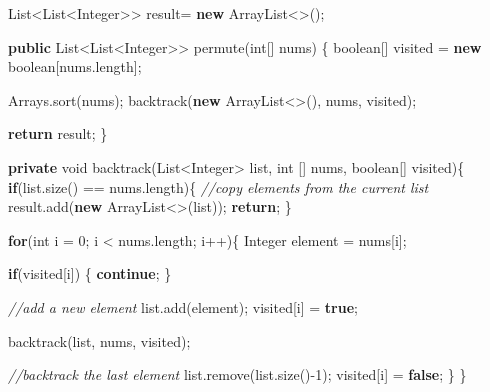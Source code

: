 \documentclass[]{book}
\newenvironment{Shaded}{\begin{snugshade}}{\end{snugshade}}
\newcommand{\BuiltInTok}[1]{#1}
\newcommand{\CommentTok}[1]{\textcolor[rgb]{0.56,0.35,0.01}{\textit{#1}}}
\newcommand{\DataTypeTok}[1]{\textcolor[rgb]{0.13,0.29,0.53}{#1}}
\newcommand{\DecValTok}[1]{\textcolor[rgb]{0.00,0.00,0.81}{#1}}
\newcommand{\FunctionTok}[1]{\textcolor[rgb]{0.00,0.00,0.00}{#1}}
\newcommand{\KeywordTok}[1]{\textcolor[rgb]{0.13,0.29,0.53}{\textbf{#1}}}
\newcommand{\NormalTok}[1]{#1}
\begin{document}
\begin{Shaded}
\begin{Highlighting}[]
\BuiltInTok{List}\NormalTok{<}\BuiltInTok{List}\NormalTok{<}\BuiltInTok{Integer}\NormalTok{>> result= }\KeywordTok{new} \BuiltInTok{ArrayList}\NormalTok{<>();}

\KeywordTok{public} \BuiltInTok{List}\NormalTok{<}\BuiltInTok{List}\NormalTok{<}\BuiltInTok{Integer}\NormalTok{>> }\FunctionTok{permute}\NormalTok{(}\DataTypeTok{int}\NormalTok{[] nums) \{}
    \DataTypeTok{boolean}\NormalTok{[] visited = }\KeywordTok{new} \DataTypeTok{boolean}\NormalTok{[nums.}\FunctionTok{length}\NormalTok{];}

    \BuiltInTok{Arrays}\NormalTok{.}\FunctionTok{sort}\NormalTok{(nums);}
    \FunctionTok{backtrack}\NormalTok{(}\KeywordTok{new} \BuiltInTok{ArrayList}\NormalTok{<>(), nums, visited);}

    \KeywordTok{return}\NormalTok{ result;}
\NormalTok{\}}

\KeywordTok{private} \DataTypeTok{void} \FunctionTok{backtrack}\NormalTok{(}\BuiltInTok{List}\NormalTok{<}\BuiltInTok{Integer}\NormalTok{> list, }\DataTypeTok{int}\NormalTok{ [] nums, }\DataTypeTok{boolean}\NormalTok{[] visited)\{}
    \KeywordTok{if}\NormalTok{(list.}\FunctionTok{size}\NormalTok{() == nums.}\FunctionTok{length}\NormalTok{)\{}
        \CommentTok{//copy elements from the current list}
\NormalTok{        result.}\FunctionTok{add}\NormalTok{(}\KeywordTok{new} \BuiltInTok{ArrayList}\NormalTok{<>(list));}
        \KeywordTok{return}\NormalTok{;}
\NormalTok{    \}}

    \KeywordTok{for}\NormalTok{(}\DataTypeTok{int}\NormalTok{ i = }\DecValTok{0}\NormalTok{; i < nums.}\FunctionTok{length}\NormalTok{; i++)\{}
        \BuiltInTok{Integer}\NormalTok{ element = nums[i];}

        \KeywordTok{if}\NormalTok{(visited[i]) \{}
            \KeywordTok{continue}\NormalTok{;}
\NormalTok{        \}}

        \CommentTok{//add a new element}
\NormalTok{        list.}\FunctionTok{add}\NormalTok{(element);}
\NormalTok{        visited[i] = }\KeywordTok{true}\NormalTok{;}

        \FunctionTok{backtrack}\NormalTok{(list, nums, visited);}

        \CommentTok{//backtrack the last element}
\NormalTok{        list.}\FunctionTok{remove}\NormalTok{(list.}\FunctionTok{size}\NormalTok{()-}\DecValTok{1}\NormalTok{);}
\NormalTok{        visited[i] = }\KeywordTok{false}\NormalTok{;}
\NormalTok{    \}}
\NormalTok{\}}
\end{Highlighting}
\end{Shaded}
\end{document}
